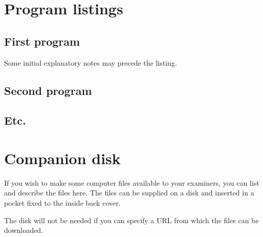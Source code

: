 \documentclass[12pt,openany,a4paper]{book}
\begin{document}
\chapter{Program listings}

\section{First program}

Some initial explanatory notes may precede the listing.

\section{Second program}

\section{Etc.}

\chapter{Companion disk}

If you wish to make some computer files available to your examiners,
you can list and describe the files here.  The files can be supplied
on a disk and inserted in a pocket fixed to the inside back cover.

The disk will not be needed if you can specify a URL from which the
files can be downloaded.

\cleardoublepage
\end{document}
